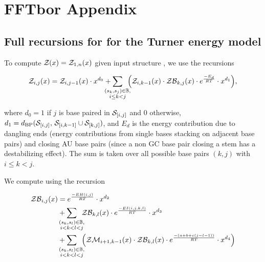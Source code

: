\documentclass[11pt, oneside]{Thesis} %
\providecommand{\DIFdelbegin}{} %
\providecommand{\DIFdelend}{} %
\begin{document}
\DIFdelbegin %

\DIFdelend %

\chapter{FFTbor Appendix}
\label{ch:fftborapp}


\section{Full recursions for \texorpdfstring{}{}
for the Turner energy model}
\label{sec:fftbor:turner}

To compute ${\mathcal Z}_{}(x) = {\mathcal Z}_{1,n}(x)$ given input structure \str, we use the recursions

\begin{align}
\label{eq:fftborapp:zx}
\emZ{i,j} = \emZ{i,j-1} \cdot x^{d_0} +
\sum_{\mathclap{\substack{(s_k,s_j) \in \bpSet, \\ i \leq k < j}}}\enspace
\Big( \emZ{i,k-1} \cdot \emZB{k,j} \cdot \boltzE{E_d} \cdot x^{d_1} \Big),
\end{align}

where $d_0 = 1$ if $j$ is base paired
in $\mathcal S_{[i,j]}$ and $0$ otherwise, $d_1 =
d_{\text{BP}}(\mathcal S_{[i,j]},\,\mathcal S_{[i,k-1]} \cup \mathcal S_{[k,j]})$, and $E_d$
is the energy contribution due to dangling ends (energy
contributions from single bases stacking on adjacent base pairs) and
closing AU base pairs (since a non GC base pair closing a stem has a
destabilizing effect).  The sum is taken over all possible
base pairs $(k,j)$ with $i \leq k < j$.

We compute \emZB{} using the recursion

\begin{align}
\label{eq:fftborapp:zbx}
\begin{split}
\emZB{i,j} &= \boltzE{EH(i,j)} \cdot x^{d_2} \\
&+ \sum_{\mathclap{\substack{(s_k,s_l) \in \bpSet, \\ i < k < l < j }}}\enspace
\emZB{k,l} \cdot \boltzE{EI(i,j,k,l)} \cdot x^{d_3} \\
&+ \sum_{\mathclap{\substack{(s_k,s_l) \in \bpSet, \\ i < k < l < j }}}\enspace
\Big( \emZM{i+1,k-1} \cdot \emZB{k,l} \cdot \boltzE{(a+b+c(j-l-1))}
\cdot x^{d_4} \Big)
\end{split}
\end{align}
\end{document}
